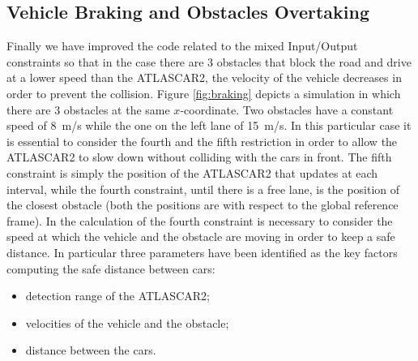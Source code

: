 \subsection{Vehicle Braking and Obstacles Overtaking}
Finally we have improved the code related to the mixed Input/Output constraints so that in the case there are 3 obstacles that block the road and drive at a lower speed than the ATLASCAR2, the velocity of the vehicle decreases in order to prevent the collision. Figure \ref{fig:braking} depicts a simulation in which there are 3 obstacles at the same $x$-coordinate. Two obstacles have a constant speed of \SI{8}{m/s} while the one on the left lane of \SI{15}{m/s}.
In this particular case it is essential to consider the fourth and the fifth restriction in order to allow the ATLASCAR2 to slow down without colliding with the cars in front. The fifth constraint is simply the position of the ATLASCAR2 that updates at each interval, while the fourth constraint, until there is a free lane, is the position of the closest obstacle (both the positions are with respect to the global reference frame). In the calculation of the fourth constraint is necessary  to consider the speed at which the vehicle and the obstacle are moving in order to keep a safe distance. In particular three parameters have been identified as the key
factors computing the safe distance between cars:
\begin{itemize}
	\item detection range of the ATLASCAR2;
	\item velocities of the vehicle and the obstacle;
	\item distance between the cars.
\end{itemize}

